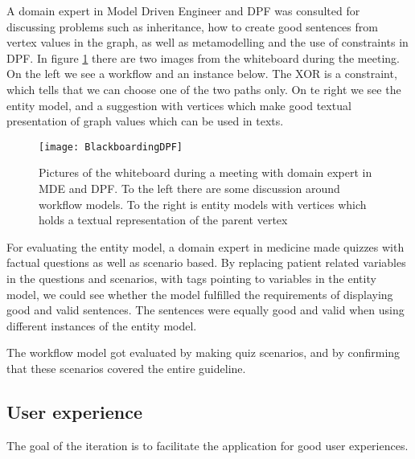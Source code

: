 A domain expert in Model Driven Engineer and DPF was consulted for discussing problems such as inheritance, how to create good sentences from vertex values in the graph, as well as metamodelling and the use of constraints in DPF. In figure \ref{fig:BlackboardingDPF} there are two images from the whiteboard during the meeting. On the left we see a workflow and an instance below. The XOR is a constraint, which tells that we can choose one of the two  paths only. On te right we see the entity model, and a suggestion with vertices which make good textual presentation of graph values which can be used in texts. 

\begin{figure}[h!]
	\texttt{[image: BlackboardingDPF]}
	\caption {Pictures of the whiteboard during a meeting with domain expert in MDE and DPF. To the left there are some discussion around workflow models. To the right is entity models with vertices which holds a textual representation of the parent vertex}
	\label{fig:BlackboardingDPF}
\end{figure}

For evaluating the entity model, a domain expert in medicine made quizzes with factual questions as well as scenario based. By replacing patient related variables in the questions and scenarios, with tags pointing to variables in the entity model, we could see whether the model fulfilled the requirements of displaying good and valid sentences. The sentences were equally good and valid when using different instances of the entity model.

The workflow model got evaluated by making quiz scenarios, and by confirming that these scenarios covered the entire guideline.



 
\subsection{User experience}
The goal of the iteration is to facilitate the application for good user experiences.

